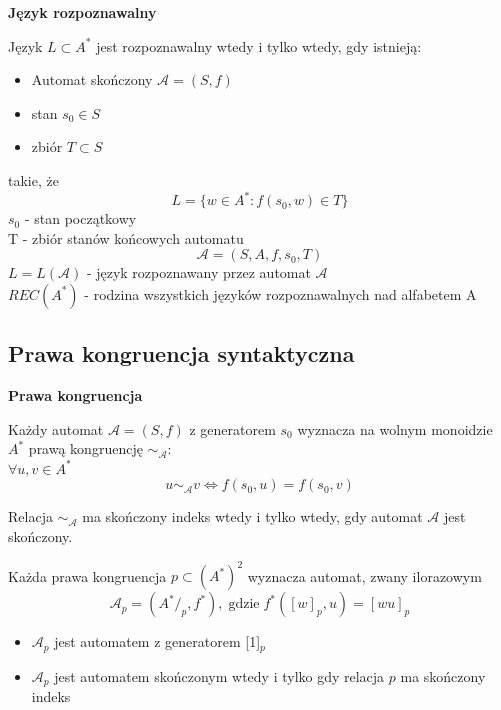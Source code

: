 \documentclass[12pt]{article}
\begin{document}
    \begin{definition}
        \textbf{Język rozpoznawalny}

        Język $L \subset A^*$ jest rozpoznawalny wtedy i tylko wtedy, gdy istnieją:
        \begin{itemize}
            \item Automat skończony $\mathcal{A} = (S, f)$
            \item stan $s_0 \in S$
            \item zbiór $T \subset S$
        \end{itemize}

        takie, że
        $$ L = \{w \in A^* : f(s_0, w) \in T\}$$
        $s_0$ - stan początkowy \\
        T - zbiór stanów końcowych automatu
        $$\mathcal{A} = (S, A, f, s_0, T)$$
        $L = L(\mathcal{A})$ - język rozpoznawany przez automat $\mathcal{A}$\\
        $REC(A^*)$ - rodzina wszystkich języków rozpoznawalnych nad alfabetem A
    \end{definition}

    \subsection{Prawa kongruencja syntaktyczna}

    \begin{definition}
        \textbf{Prawa kongruencja}

        Każdy automat $\mathcal{A} = (S, f)$ z generatorem $s_0$ wyznacza na wolnym
        monoidzie $A^*$ prawą kongruencję $\sim_\mathcal{A}$:
        \[\]
        $\forall u, v \in A^*$
        $$u \sim_\mathcal{A} v \Leftrightarrow f(s_0, u) = f(s_0, v)$$

        Relacja $\sim_{\mathcal{A}}$ ma skończony indeks wtedy i tylko wtedy, gdy automat
        $\mathcal{A}$ jest skończony.
    \end{definition}

    \begin{theorem}
        Każda prawa kongruencja $p \subset (A^*)^2$ wyznacza automat, zwany ilorazowym
        $$\mathcal{A}_p = (A^* /_{p}, f^*), \; \mathrm{gdzie} \; f^*([w]_p, u) = [wu]_p$$
        \begin{itemize}
            \item $\mathcal{A}_p$ jest automatem z generatorem [1]$_p$

            \item $\mathcal{A}_p$ jest automatem skończonym wtedy i tylko gdy relacja $p$ ma skończony indeks
        \end{itemize}
    \end{theorem}
\end{document}
